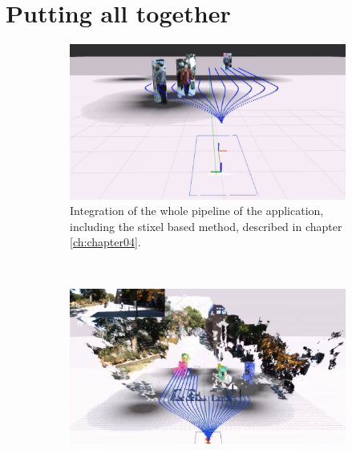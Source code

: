 \FloatBarrier

\section{Putting all together}\label{ch:chapter08_08}

\begin{figure}[p]
\centering
  \begin{subfigure}[b]{\textwidth}
    \centering
    \includegraphics[width=\textwidth, height=0.75\textwidth]{stixels_whole_pipeline}
    \caption{Integration of the whole pipeline of the application, including the stixel based method, described in chapter \ref{ch:chapter04}.}\label{fig:cp07_stixels_whole_pipeline}
  \end{subfigure}
  ~
  \begin{subfigure}[b]{\textwidth}
    \centering
    \includegraphics[width=\textwidth, height=0.75\textwidth]{particle_filter_whole_pipeline}

\end{subfigure}
\end{figure}
